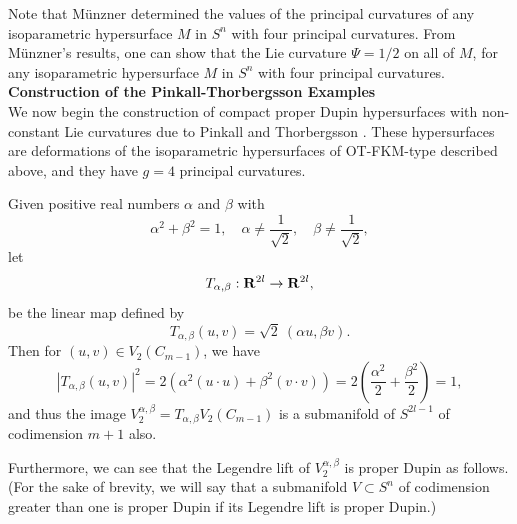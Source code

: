 \documentclass[12pt]{article}
\begin{document}
Note that M\"{u}nzner
\cite{Mu} determined the values of the principal curvatures of any isoparametric hypersurface $M$
in $S^n$ with four principal curvatures.  From M\"{u}nzner's results, one can show that the Lie curvature $\Psi = 1/2$ on all of $M$, for any isoparametric hypersurface $M$
in $S^n$ with four principal curvatures. \\


\noindent
{\bf Construction of the Pinkall-Thorbergsson Examples}\\


We now begin the construction of compact proper Dupin hypersurfaces with non-constant Lie curvatures
due to Pinkall and Thorbergsson \cite{PT1}.  
These hypersurfaces are deformations of the isoparametric hypersurfaces of OT-FKM-type described above, and they have $g=4$ principal curvatures.


Given positive real numbers $\alpha$ and $\beta$ with
\begin{displaymath}
\alpha^2 + \beta^2 = 1, \quad \alpha \neq \frac{1}{\sqrt{2}}, \quad \beta \neq \frac{1}{\sqrt{2}},
\end{displaymath}
let 
\begin{displaymath}
T_{\alpha,\beta} : {\bf R}^{2l} \rightarrow {\bf R}^{2l},
\end{displaymath}
be the linear map defined by
\begin{displaymath}
T_{\alpha,\beta} (u,v) = \sqrt{2}\  (\alpha u, \beta v).
\end{displaymath}
Then for $(u,v) \in V_2 (C_{m-1})$, we have
\begin{displaymath}
|T_{\alpha,\beta} (u,v)|^2 = 2 (\alpha^2 (u \cdot u) + \beta^2 (v \cdot v)) = 2 (\frac{\alpha^2}{2} + \frac{\beta^2}{2})=1,
\end{displaymath}
and thus the image $V^{\alpha,\beta}_2 = T_{\alpha,\beta}V_2 (C_{m-1})$ is a submanifold of $S^{2l-1}$ of
codimension $m+1$ also.

Furthermore, we can see that the Legendre lift of $V^{\alpha,\beta}_2$ is proper Dupin 
as follows.  (For the sake of brevity, we
will say that a submanifold $V \subset S^n$ of codimension greater than one is proper 
Dupin if its Legendre lift is proper Dupin.)
\end{document}
